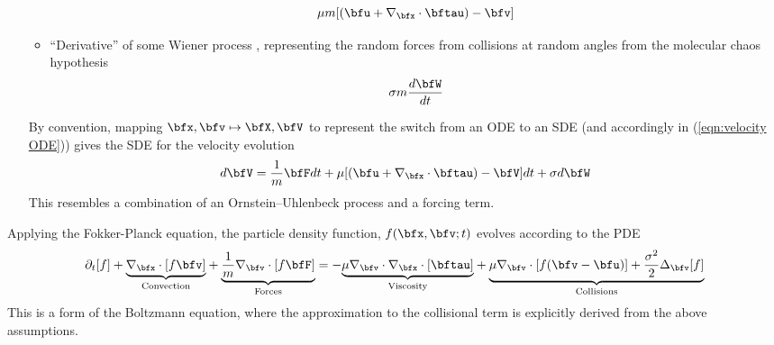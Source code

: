 \begin{itemize}
\begin{itemize}
            \begin{equation}\label{eqn:single-phase drag force}
                \mu m[(\bfu + \nabla_{\bfx}\cdot\bftau) - \bfv]
            \end{equation}
            \item  ``Derivative'' of some Wiener process , representing the random forces from collisions at random angles from the molecular chaos hypothesis
            \begin{equation}\label{eqn:single-phase brownian motion}
                \sigma m\frac{d\bfW}{dt}
            \end{equation}
        \end{itemize}
        
        
        By convention, mapping $\bfx, \bfv  \mapsto  \bfX, \bfV$ to represent the switch from an ODE to an SDE (and accordingly in (\ref{eqn:velocity ODE})) gives the SDE for the velocity evolution
        \begin{equation}
            d\bfV  =  \frac{1}{m}\bfF dt + \mu[(\bfu + \nabla_{\bfx}\cdot\bftau) - \bfV]dt + \sigma d\bfW
        \end{equation}
        This resembles a combination of an Ornstein--Uhlenbeck process and a forcing term.
    \end{itemize}
    Applying the Fokker-Planck equation, the particle density function, $f(\bfx, \bfv; t)$ evolves according to the PDE
    \begin{equation}\label{eqn:single-phase Boltzmann equation}
        \partial_{t}[f] + \underset{\textrm{Convection}}{\underbrace{\nabla_{\bfx}\cdot[f\bfv]}} + \underset{\textrm{Forces}}{\underbrace{\frac{1}{m}\nabla_{\bfv}\cdot[f\bfF]}}  =  - \underset{\textrm{Viscosity}}{\underbrace{\mu\nabla_{\bfv}\cdot\nabla_{\bfx}\cdot[\bftau]}} + \underset{\textrm{Collisions}}{\underbrace{\mu\nabla_{\bfv}\cdot[f(\bfv - \bfu)] + \frac{\sigma^{2}}{2}\Delta_{\bfv}[f]}}
    \end{equation}
    This is a form of the Boltzmann equation, where the approximation to the collisional term is explicitly derived from the above assumptions.